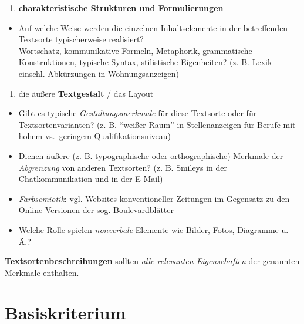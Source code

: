 \documentclass[
  letterpaper,
]{scrbook}
\providecommand{\tightlist}{%
  \setlength{\itemsep}{0pt}\setlength{\parskip}{0pt}}\usepackage{longtable,booktabs,array}
\begin{document}
\begin{enumerate}
\def\labelenumi{\arabic{enumi}.}
\setcounter{enumi}{3}
\tightlist
\item
  \textbf{charakteristische Strukturen und Formulierungen}\\
\end{enumerate}

\begin{itemize}
\tightlist
\item
  Auf welche Weise werden die einzelnen Inhaltselemente in der
  betreffenden Textsorte typischerweise realisiert?\\
  Wortschatz, kommunikative Formeln, Metaphorik, grammatische
  Konstruktionen, typische Syntax, stilistische Eigenheiten? (z. B.
  Lexik einschl. Abkürzungen in Wohnungsanzeigen)\\
\end{itemize}

\begin{enumerate}
\def\labelenumi{\arabic{enumi}.}
\setcounter{enumi}{4}
\tightlist
\item
  die äußere \textbf{Textgestalt} / das Layout\\
\end{enumerate}

\begin{itemize}
\tightlist
\item
  Gibt es typische \emph{Gestaltungsmerkmale} für diese Textsorte oder
  für Textsortenvarianten? (z. B. ``weißer Raum'' in Stellenanzeigen für
  Berufe mit hohem vs.~geringem Qualifikationsniveau)\\
\item
  Dienen äußere (z. B. typographische oder orthographische) Merkmale der
  \emph{Abgrenzung} von anderen Textsorten? (z. B. Smileys in der
  Chatkommunikation und in der E-Mail)\\
\item
  \emph{Farbsemiotik}: vgl. Websites konventioneller Zeitungen im
  Gegensatz zu den Online-Versionen der sog. Boulevardblätter\\
\item
  Welche Rolle spielen \emph{nonverbale} Elemente wie Bilder, Fotos,
  Diagramme u. Ä.?\\
\end{itemize}

\textbf{Textsortenbeschreibungen} sollten \emph{alle relevanten
Eigenschaften} der genannten Merkmale enthalten.

\hypertarget{basiskriterium}{%
\section{Basiskriterium}\label{basiskriterium}}
\end{document}
